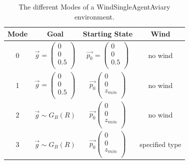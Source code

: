 \begin{table}[htp]
	\centering
	\caption{The different Modes of a WindSingleAgentAviary environment.}\label{tab:mode}
	\begin{tabular}{|c|c|c|c|}
		\hline
		Mode & Goal & Starting State & Wind\\
		\hline
		0 & $\overrightarrow{g} =\left(\begin{array}{c}
			0\\
			0\\
			0.5\\
		\end{array}
		\right)$ & $\overrightarrow{p_0} = \left(\begin{array}{c}
			0\\
			0\\
			0.5\\
		\end{array}
		\right)$ & no wind\\
		\hline
		1 & $\overrightarrow{g} = \left(\begin{array}{c}
			0\\
			0\\
			0.5\\
		\end{array}
		\right)$ & $\overrightarrow{p_0}\left(\begin{array}{c}
			0\\
			0\\
			z_{min}\\
		\end{array}
		\right)$ & no wind\\
		\hline
		2 & $\overrightarrow{g} \sim G_{B}(R) $& $\overrightarrow{p_0}\left(\begin{array}{c}
			0\\
			0\\
			z_{min}\\
		\end{array}
		\right)$  & no wind\\
		\hline
		3 & $\overrightarrow{g} \sim G_{B}(R) $& $\overrightarrow{p_0}\left(\begin{array}{c}
			0\\
			0\\
			z_{min}\\
		\end{array}
		\right)$  & specified type\\
		\hline
	\end{tabular}
	\label{tab:modes}
\end{table}

